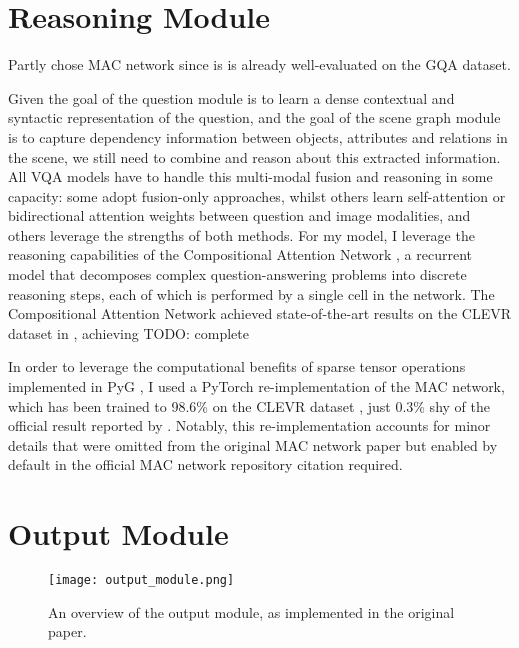 \section{Reasoning Module}
\label{section:reasoning_module}

{\color{red}Partly chose MAC network since is is already well-evaluated on the GQA dataset.}

Given the goal of the question module is to learn a dense contextual and syntactic representation of the question, and the goal of the scene graph module is to capture dependency information between objects, attributes and relations in the scene, we still need to combine and reason about this extracted information. All VQA models have to handle this multi-modal fusion and reasoning in some capacity: some adopt fusion-only approaches, whilst others learn self-attention or bidirectional attention weights between question and image modalities, and others leverage the strengths of both methods. For my model, I leverage the reasoning capabilities of the Compositional Attention Network \citeauthor{hudson2018compositional}, a recurrent model that decomposes complex question-answering problems into discrete reasoning steps, each of which is performed by a single cell in the network. The Compositional Attention Network achieved state-of-the-art results on the CLEVR dataset in \citeyear{hudson2018compositional}, achieving {\color{red} TODO: complete}

In order to leverage the computational benefits of sparse tensor operations implemented in PyG \cite{fey2019fast}, I used a PyTorch \cite{paszke2019pytorch} re-implementation of the MAC network, which has been trained to 98.6\% on the CLEVR dataset \cite{eyzaguirre2020differentiable}, just 0.3\% shy of the official result reported by 
\citeauthor{hudson2018compositional}. Notably, this re-implementation accounts for minor details that were omitted from the original MAC network paper but enabled by default in the official MAC network repository {\color{red} citation required}.



\section{Output Module}
\label{section:output_module}

\begin{figure}[htbp]
    \centering
    \texttt{[image: output\_module.png]}
    \caption{An overview of the output module, as implemented in the original paper.}
    \label{fig:output_module}
\end{figure}

